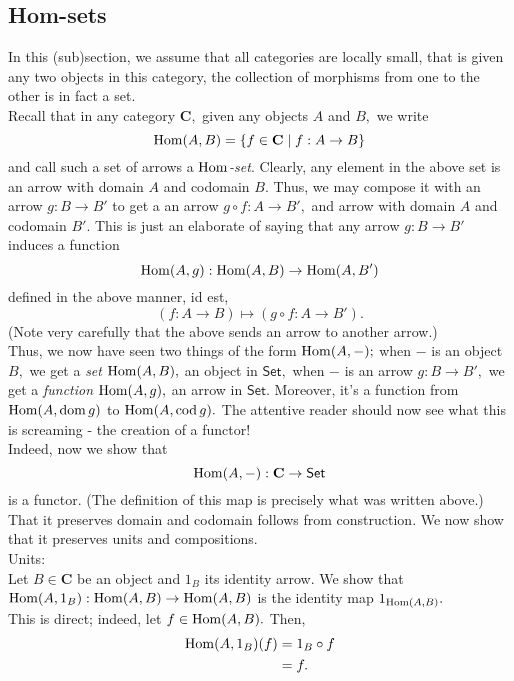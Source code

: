 \subsection{Hom-sets}
In this (sub)section, we assume that all categories are locally small, that is given any two objects in this category, the collection of morphisms from one to the other is in fact a set.\\
Recall that in any category $\mathbf{C},$ given any objects $A$ and $B,$ we write
\begin{equation*} 
	\operatorname{Hom}(A, B) = \{f \in \mathbf{C} \mid f:A\to B\}
\end{equation*}
and call such a set of arrows a \emph{$\operatorname{Hom}$-set}. Clearly, any element in the above set is an arrow with domain $A$ and codomain $B.$ Thus, we may compose it with an arrow $g : B \to B'$ to get a an arrow $g\circ f:A \to B',$ and arrow with domain $A$ and codomain $B'.$ This is just an elaborate of saying that any arrow $g:B\to B'$ induces a function
\begin{equation*} 
	\operatorname{Hom}(A, g) : \operatorname{Hom}(A, B) \to \operatorname{Hom}(A, B')
\end{equation*}
defined in the above manner, id est,
\begin{equation*} 
	(f: A \to B) \mapsto (g \circ f:A \to B').
\end{equation*}
(Note very carefully that the above sends an arrow to another arrow.)\\
Thus, we now have seen two things of the form $\operatorname{Hom}(A, -);$ when $-$ is an object $B,$ we get a \emph{set} $\operatorname{Hom}(A, B),$ an object in $\mathsf{Set},$ when $-$ is an arrow $g:B\to B',$ we get a \emph{function} $\operatorname{Hom}(A, g),$ an arrow in $\mathsf{Set}.$ Moreover, it's a function from $\operatorname{Hom}(A, \operatorname{dom} g)$ to $\operatorname{Hom}(A, \operatorname{cod} g).$ The attentive reader should now see what this is screaming - the creation of a functor!\\
Indeed, now we show that
\begin{equation*} 
	\operatorname{Hom}(A, -) : \mathbf{C} \to \mathsf{Set}
\end{equation*}
is a functor. (The definition of this map is precisely what was written above.)\\
That it preserves domain and codomain follows from construction. We now show that it preserves units and compositions.\\
Units:\\
Let $B \in \mathbf{C}$ be an object and $1_B$ its identity arrow. We show that $\operatorname{Hom}(A, 1_B):\operatorname{Hom}(A, B) \to \operatorname{Hom}(A, B)$ is the identity map $1_{\operatorname{Hom}(A, B)}.$\\
This is direct; indeed, let $f \in \operatorname{Hom}(A, B).$ Then,
\begin{align*} 
	\operatorname{Hom}(A, 1_B)(f) &= 1_B \circ f\\
	&= f.
\end{align*}

